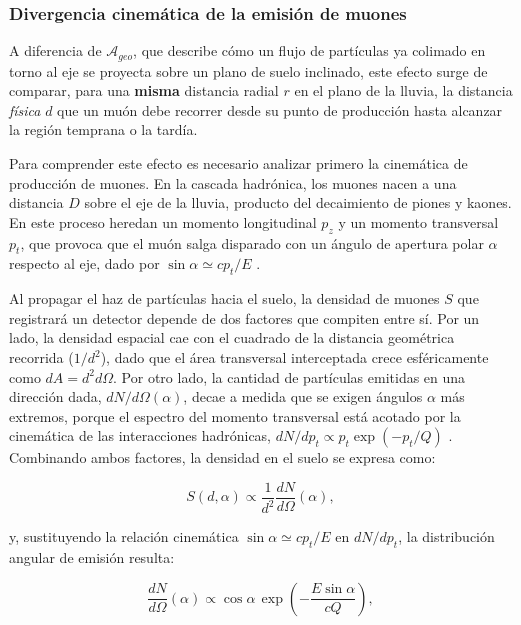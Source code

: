 \subsubsection{Divergencia cinemática de la emisión de muones}
\label{subsubsec:divergencia_cinematica}

A diferencia de $\mathcal{A}_{geo}$, que describe cómo un flujo de partículas ya colimado en torno al eje se proyecta sobre un plano de suelo inclinado, este efecto surge de comparar, para una \textbf{misma} distancia radial $r$ en el plano de la lluvia, la distancia \textit{física} $d$ que un muón debe recorrer desde su punto de producción hasta alcanzar la región temprana o la tardía.

Para comprender este efecto es necesario analizar primero la cinemática de producción de muones. En la cascada hadrónica, los muones nacen a una distancia $D$ sobre el eje de la lluvia, producto del decaimiento de piones y kaones. En este proceso heredan un momento longitudinal $p_z$ y un momento transversal $p_t$, que provoca que el muón salga disparado con un ángulo de apertura polar $\alpha$ respecto al eje, dado por $\sin\alpha \simeq cp_t/E$ \cite{Cazon2012}.

Al propagar el haz de partículas hacia el suelo, la densidad de muones $S$ que registrará un detector depende de dos factores que compiten entre sí. Por un lado, la densidad espacial cae con el cuadrado de la distancia geométrica recorrida ($1/d^2$), dado que el área transversal interceptada crece esféricamente como $dA = d^2 d\Omega$. Por otro lado, la cantidad de partículas emitidas en una dirección dada, $dN/d\Omega(\alpha)$, decae a medida que se exigen ángulos $\alpha$ más extremos, porque el espectro del momento transversal está acotado por la cinemática de las interacciones hadrónicas, $dN/dp_t \propto p_t \exp(-p_t/Q)$ \cite{Cazon2012}. Combinando ambos factores, la densidad en el suelo se expresa como:

\begin{equation}
	S(d, \alpha) \propto \frac{1}{d^2} \frac{dN}{d\Omega}(\alpha),
	\label{eq:asym_a1_previa}
\end{equation}

y, sustituyendo la relación cinemática $\sin\alpha \simeq cp_t/E$ en $dN/dp_t$, la distribución angular de emisión resulta:

\begin{equation}
	\frac{dN}{d\Omega}(\alpha) \propto \cos\alpha \, \exp\left(-\frac{E \sin\alpha}{cQ}\right),
	\label{eq:cazon_dNdOmega}
\end{equation}

